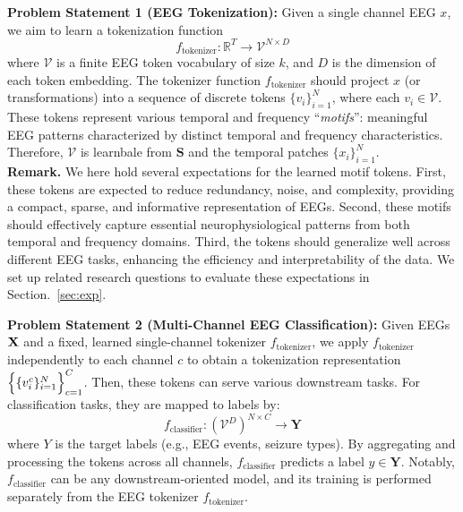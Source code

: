 
\noindent\textbf{Problem Statement 1 (EEG Tokenization):} Given a single channel EEG $x$, we aim to learn a tokenization function 
$$
f_{\text{tokenizer}}: \mathbb{R}^T \rightarrow \mathcal{V}^{N \times D}
$$
where $\mathcal{V}$ is a finite EEG token vocabulary of size $k$, and $D$ is the dimension of each token embedding. 
The tokenizer function $f_{\text{tokenizer}}$ should project $x$ (or transformations) into a sequence of discrete tokens $\{v_i\}_{i=1}^N$,
where each $v_i\in \mathcal{V}$.
These tokens represent various temporal and frequency ``\textit{motifs}'': meaningful EEG patterns characterized by distinct temporal and frequency characteristics. Therefore, $\mathcal{V}$ is learnbale from $\mathbf{S}$ and the temporal patches $\{x_i\}_{i=1}^N$.\\
\textbf{Remark.}
We here hold several expectations for the learned motif tokens.
First, these tokens are expected to reduce redundancy, noise, and complexity, providing a compact, sparse, and informative representation of EEGs.
Second, these motifs should effectively capture essential neurophysiological patterns from both temporal and frequency domains.
Third, the tokens should generalize well across different EEG tasks, enhancing the efficiency and interpretability of the data.
We set up related research questions to evaluate these expectations in Section.~\ref{sec:exp}.


\noindent\textbf{Problem Statement 2 (Multi-Channel EEG Classification):} 
Given EEGs $\mathbf{X}$ and a fixed, learned single-channel tokenizer $f_{\text{tokenizer}}$, we apply $f_{\text{tokenizer}}$ independently to each channel $c$ to obtain a tokenization representation  $\Bigl\{\{v_i^c\}_{i=1}^N\Bigr\}_{c=1}^C$. 
Then, these tokens can serve various downstream tasks. For classification tasks, they are mapped to labels by:
$$
f_{\text{classifier}}: (\mathcal{V}^D)^{N \times C}\rightarrow \mathbf{Y}
$$
where $Y$ is the target labels (e.g., EEG events, seizure types). 
By aggregating and processing the tokens across all channels, $f_{\text{classifier}}$ predicts a label $y\in\mathbf{Y}$. 
Notably, $f_{\text{classifier}}$ can be any downstream-oriented model, and its training is performed separately from the EEG tokenizer $f_{\text{tokenizer}}$.


